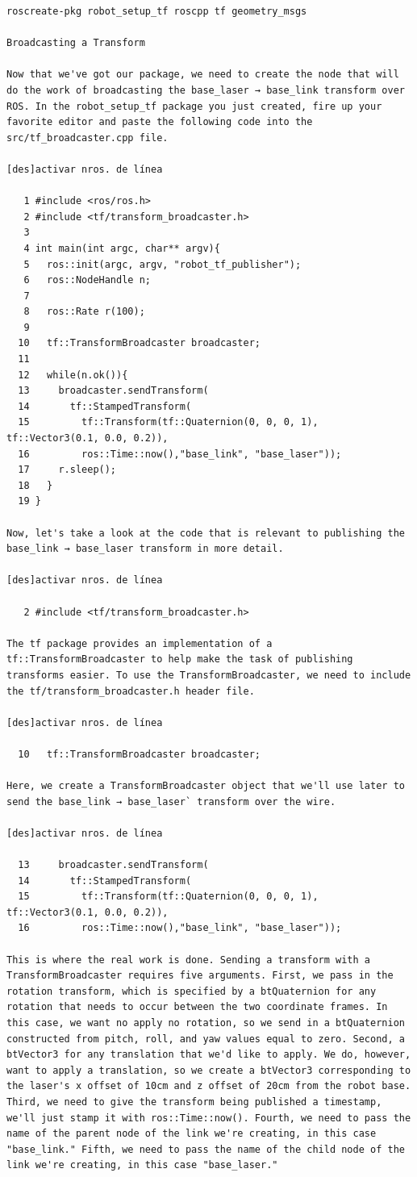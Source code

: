 \begin{verbatim}
roscreate-pkg robot_setup_tf roscpp tf geometry_msgs

Broadcasting a Transform

Now that we've got our package, we need to create the node that will do the work of broadcasting the base_laser → base_link transform over ROS. In the robot_setup_tf package you just created, fire up your favorite editor and paste the following code into the src/tf_broadcaster.cpp file.

[des]activar nros. de línea

   1 #include <ros/ros.h>
   2 #include <tf/transform_broadcaster.h>
   3 
   4 int main(int argc, char** argv){
   5   ros::init(argc, argv, "robot_tf_publisher");
   6   ros::NodeHandle n;
   7 
   8   ros::Rate r(100);
   9 
  10   tf::TransformBroadcaster broadcaster;
  11 
  12   while(n.ok()){
  13     broadcaster.sendTransform(
  14       tf::StampedTransform(
  15         tf::Transform(tf::Quaternion(0, 0, 0, 1), tf::Vector3(0.1, 0.0, 0.2)),
  16         ros::Time::now(),"base_link", "base_laser"));
  17     r.sleep();
  18   }
  19 }

Now, let's take a look at the code that is relevant to publishing the base_link → base_laser transform in more detail.

[des]activar nros. de línea

   2 #include <tf/transform_broadcaster.h>

The tf package provides an implementation of a tf::TransformBroadcaster to help make the task of publishing transforms easier. To use the TransformBroadcaster, we need to include the tf/transform_broadcaster.h header file.

[des]activar nros. de línea

  10   tf::TransformBroadcaster broadcaster;

Here, we create a TransformBroadcaster object that we'll use later to send the base_link → base_laser` transform over the wire.

[des]activar nros. de línea

  13     broadcaster.sendTransform(
  14       tf::StampedTransform(
  15         tf::Transform(tf::Quaternion(0, 0, 0, 1), tf::Vector3(0.1, 0.0, 0.2)),
  16         ros::Time::now(),"base_link", "base_laser"));

This is where the real work is done. Sending a transform with a TransformBroadcaster requires five arguments. First, we pass in the rotation transform, which is specified by a btQuaternion for any rotation that needs to occur between the two coordinate frames. In this case, we want no apply no rotation, so we send in a btQuaternion constructed from pitch, roll, and yaw values equal to zero. Second, a btVector3 for any translation that we'd like to apply. We do, however, want to apply a translation, so we create a btVector3 corresponding to the laser's x offset of 10cm and z offset of 20cm from the robot base. Third, we need to give the transform being published a timestamp, we'll just stamp it with ros::Time::now(). Fourth, we need to pass the name of the parent node of the link we're creating, in this case "base_link." Fifth, we need to pass the name of the child node of the link we're creating, in this case "base_laser."


\end{verbatim}
